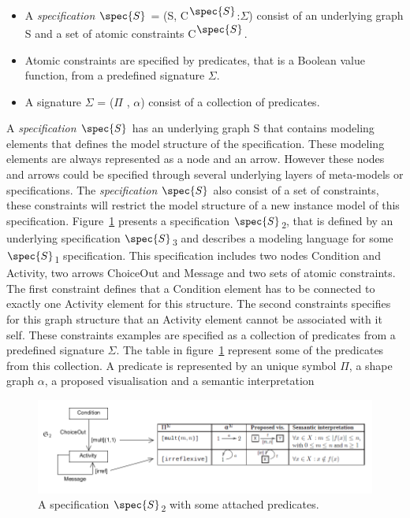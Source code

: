 \begin{itemize}
  
\item A \emph{specification $\spec{S}$} = (S,
C\textsuperscript{$\spec{S}$}:$\Sigma$) consist of an underlying graph S and a
set of atomic constraints C\textsuperscript{$\spec{S}$}. 

\item Atomic constraints are specified by predicates, that is a Boolean value
function, from a predefined signature $\Sigma$.

\item A signature $\Sigma$ = ($\Pi$ \hspace{1 mm}, \hspace{1 mm}$\alpha$)
consist of a collection of predicates. 
  
\end{itemize}

A \emph{specification $\spec{S}$} has an underlying graph S that contains
modeling elements that defines the model structure of the specification. These
modeling elements are always represented as a node and an arrow. However these
nodes and arrows could be specified through several underlying layers of
meta-models or specifications. The \emph{specification $\spec{S}$} also consist
of a set of constraints, these constraints will restrict the model structure of
a new instance model of this specification. Figure~\ref{fig:DPF_Spec} presents a
specification $\spec{S}$\textsubscript{2}, that is defined by an underlying
specification $\spec{S}$\textsubscript{3} and describes a modeling language for
some $\spec{S}$\textsubscript{1} specification. This specification includes two
nodes Condition and Activity, two arrows ChoiceOut and Message and  two sets of
atomic constraints. The first constraint defines that a Condition element has
to be connected to exactly one Activity element for this structure. The second
constraints specifies for this graph structure that an Activity element cannot
be associated with it self. These constraints examples are specified as a
collection of predicates from a predefined signature $\Sigma$. The table in
figure~\ref{fig:DPF_Spec} represent some of the predicates from this
collection. A predicate is represented by an unique symbol $\Pi$, a shape graph
$\alpha$, a proposed visualisation and a semantic interpretation

\begin{figure}[H]
	\centering
	\includegraphics[scale=0.7]{./Figures/DPF_spec_constraints.png}
	\caption[A specification and some predefined diagrammatic predicate attached]
	{A specification $\spec{S}$\textsubscript{2} with some attached predicates.}
	\label{fig:DPF_Spec}
\end{figure}

